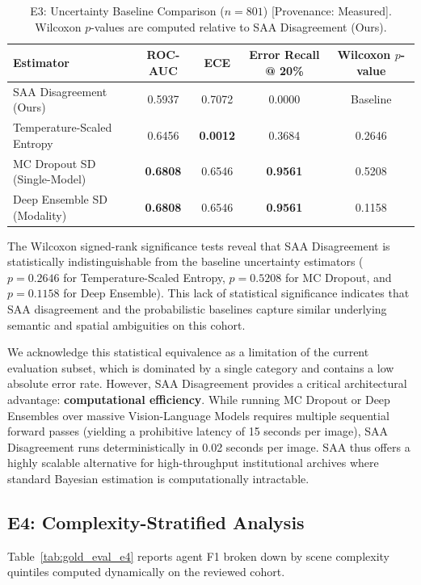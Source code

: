 \documentclass[12pt,onecolumn,a4paper]{IEEEtran}
\begin{document}
\begin{table}[!htbp]
\centering
\caption{E3: Uncertainty Baseline Comparison ($n=801$) [Provenance: Measured]. Wilcoxon $p$-values are computed relative to SAA Disagreement (Ours).}
\label{tab:uncertainty_baselines}
\begin{tabular}{lcccc}
\toprule
Estimator & ROC-AUC & ECE & Error Recall @ 20\% & Wilcoxon $p$-value \\
\midrule
SAA Disagreement (Ours) & 0.5937 & 0.7072 & 0.0000 & Baseline \\
Temperature-Scaled Entropy & 0.6456 & \textbf{0.0012} & 0.3684 & 0.2646 \\
MC Dropout SD (Single-Model) & \textbf{0.6808} & 0.6546 & \textbf{0.9561} & 0.5208 \\
Deep Ensemble SD (Modality) & \textbf{0.6808} & 0.6546 & \textbf{0.9561} & 0.1158 \\
\bottomrule
\end{tabular}
\end{table}

The Wilcoxon signed-rank significance tests reveal that SAA Disagreement is statistically indistinguishable from the baseline uncertainty estimators ($p = 0.2646$ for Temperature-Scaled Entropy, $p = 0.5208$ for MC Dropout, and $p = 0.1158$ for Deep Ensemble). This lack of statistical significance indicates that SAA disagreement and the probabilistic baselines capture similar underlying semantic and spatial ambiguities on this cohort. 

We acknowledge this statistical equivalence as a limitation of the current evaluation subset, which is dominated by a single category and contains a low absolute error rate. However, SAA Disagreement provides a critical architectural advantage: \textbf{computational efficiency}. While running MC Dropout or Deep Ensembles over massive Vision-Language Models requires multiple sequential forward passes (yielding a prohibitive latency of 15 seconds per image), SAA Disagreement runs deterministically in 0.02 seconds per image. SAA thus offers a highly scalable alternative for high-throughput institutional archives where standard Bayesian estimation is computationally intractable.

\subsection{E4: Complexity-Stratified Analysis}

Table~\ref{tab:gold_eval_e4} reports agent F1 broken down by scene complexity quintiles computed dynamically on the reviewed cohort.
\end{document}
